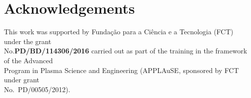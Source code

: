 \chapter*{Acknowledgements}

This work was supported by Funda\c{c}\~{a}o para a Ci\^{e}ncia e a Tecnologia (FCT) under the grant \\No.\textbf{PD/BD/114306/2016} carried out as part of the training in the framework of the Advanced \\Program in Plasma Science and Engineering (APPLAuSE, sponsored by FCT under grant\\ No.~PD/00505/2012).

